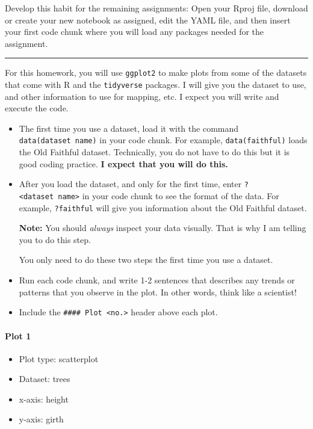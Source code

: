 \documentclass[]{article}
\providecommand{\tightlist}{%
  \setlength{\itemsep}{0pt}\setlength{\parskip}{0pt}}
\let\oldparagraph\paragraph
\renewcommand{\paragraph}[1]{\oldparagraph{#1}\mbox{}}
\begin{document}
Develop this habit for the remaining assignments: Open your Rproj file,
download or create your new notebook as assigned, edit the YAML file,
and then insert your first code chunk where you will load any packages
needed for the assignment.

\begin{center}\rule{0.5\linewidth}{\linethickness}\end{center}

For this homework, you will use \texttt{ggplot2} to make plots from some
of the datasets that come with R and the \texttt{tidyverse} packages. I
will give you the dataset to use, and other information to use for
mapping, etc. I expect you will write and execute the code.

\begin{itemize}
\item
  The first time you use a dataset, load it with the command
  \texttt{data(dataset\ name)} in your code chunk. For example,
  \texttt{data(faithful)} loads the Old Faithful dataset. Technically,
  you do not have to do this but it is good coding practice. \textbf{I
  expect that you will do this.}
\item
  After you load the dataset, and only for the first time, enter
  \texttt{?\textless{}dataset\ name\textgreater{}} in your code chunk to
  see the format of the data. For example, \texttt{?faithful} will give
  you information about the Old Faithful dataset.

  \textbf{Note:} You should \emph{always} inspect your data visually.
  That is why I am telling you to do this step.

  You only need to do these two steps the first time you use a dataset.
\item
  Run each code chunk, and write 1-2 sentences that describes any trends
  or patterns that you observe in the plot. In other words, think like a
  scientist!
\item
  Include the \texttt{\#\#\#\#\ Plot\ \textless{}no.\textgreater{}}
  header above each plot.
\end{itemize}

\hypertarget{plot-1}{%
\paragraph{Plot 1}\label{plot-1}}

\begin{itemize}
\tightlist
\item
  Plot type: scatterplot
\item
  Dataset: trees
\item
  x-axis: height
\item
  y-axis: girth
\end{itemize}
\end{document}
